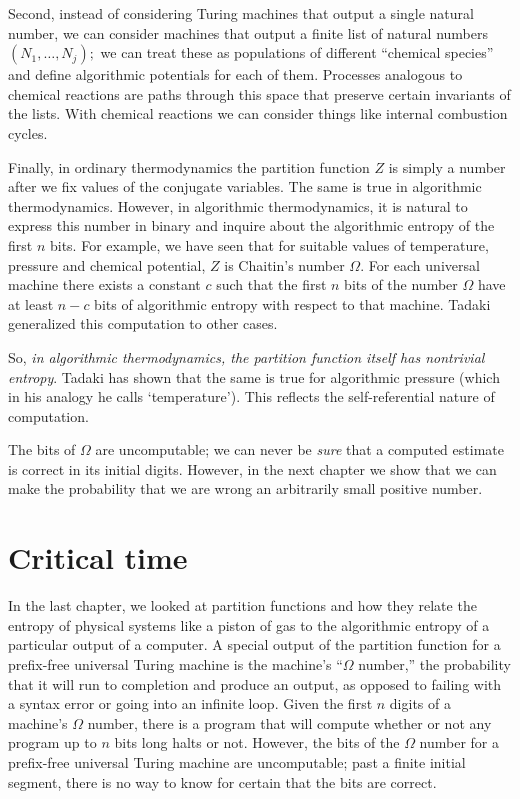 \documentclass[12pt,twoside,openright]{report}
\begin{document}
Second, instead of considering Turing machines that output a single natural number, we can consider machines that output a finite list of natural numbers $(N_1, \ldots, N_j);$ we can treat these as populations of different ``chemical species'' and define algorithmic potentials for each of them.  Processes analogous to chemical reactions are paths through this space that preserve certain invariants of the lists.  With chemical reactions we can consider things like internal combustion cycles.

Finally, in ordinary thermodynamics the partition function $Z$ is simply a number after we fix values of the conjugate variables.  The same is true in algorithmic thermodynamics.  However, in algorithmic thermodynamics, it is natural to express this number in binary and inquire about the algorithmic entropy of the first $n$ bits.  For example, we have seen that for suitable values of temperature, pressure and chemical potential, $Z$ is Chaitin's number $\Omega$. For each universal machine there exists a constant $c$ such that the first $n$ bits of the number $\Omega$ have at least 
$n - c$ bits of algorithmic entropy with respect to that machine.  Tadaki \cite{Tadaki2002} generalized this computation to other cases.

So, \textit{in algorithmic thermodynamics, the partition function itself has nontrivial entropy}.  Tadaki has shown that the same is true for algorithmic pressure (which in his analogy he calls `temperature').   This reflects the self-referential nature of computation.  

The bits of $\Omega$ are uncomputable; we can never be {\em sure} that a computed estimate is correct in its initial digits.  However, in the next chapter we show that we can make the probability that we are wrong an arbitrarily small positive number.  

\chapter{Critical time}

In the last chapter, we looked at partition functions and how they relate the entropy of physical systems like a piston of gas to the algorithmic entropy of a particular output of a computer.  A special output of the partition function for a prefix-free universal Turing machine is the machine's ``$\Omega$ number,'' the probability that it will run to completion and produce an output, as opposed to failing with a syntax error or going into an infinite loop.  Given the first $n$ digits of a machine's $\Omega$ number, there is a program that will compute whether or not any program up to $n$ bits long halts or not.  However, the bits of the $\Omega$ number for a prefix-free universal Turing machine are uncomputable; past a finite initial segment, there is no way to know for certain that the bits are correct.
\end{document}
